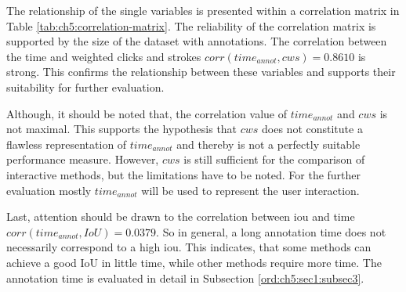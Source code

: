 The relationship of the single variables is presented within a correlation matrix in Table \ref{tab:ch5:correlation-matrix}.
The reliability of the correlation matrix is supported by the size of the dataset with \getNumberBenchmarkAnnotations \space annotations.
The correlation between the time and weighted clicks and strokes $ corr \left(time_{annot}, cws \right) = 0.8610 $ is strong.
This confirms the relationship between these variables and supports their suitability for further evaluation.

Although, it should be noted that, the correlation value of $ time_{annot} $ and $ cws $ is not maximal.
This supports the hypothesis that $ cws $ does not constitute a flawless representation of $ time_{annot} $ and thereby is not a perfectly suitable performance measure.
However, $ cws $ is still sufficient for the comparison of interactive methods, but the limitations have to be noted.
For the further evaluation mostly $ time_{annot} $ will be used to represent the user interaction.

Last, attention should be drawn to the correlation between \gls{iou} and time \linebreak $ corr \left(time_{annot}, IoU \right) = 0.0379 $.
So in general, a long annotation time does not necessarily correspond to a high \gls{iou}.
This indicates, that some methods can achieve a good IoU in little time, while other methods require more time.
The annotation time is evaluated in detail in Subsection \ref{ord:ch5:sec1:subsec3}. 

